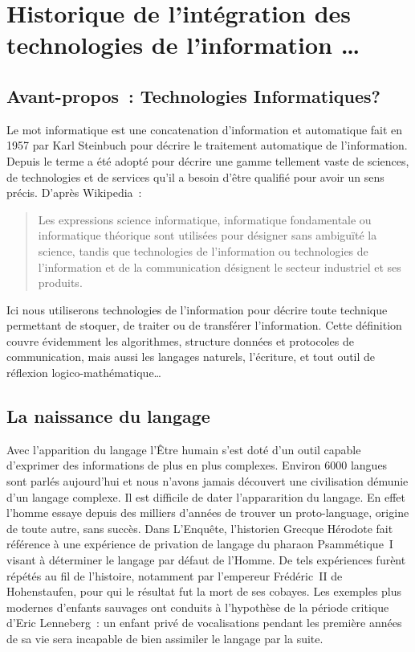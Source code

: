 
\chapter{Historique de l'intégration des technologies de l'information \ldots}\label{quoi}

\section*{Avant-propos~: Technologies \og{}Informatiques\fg{}?}
Le mot \og{}informatique\fg{} est une concatenation d'\og{}information\fg{} et \og{}automatique\fg{} fait en 1957 par Karl Steinbuch\cite{steinbuch-2005} pour décrire le traitement automatique de l'information. 
Depuis le terme a été adopté pour décrire une gamme tellement vaste de sciences, de technologies et de services qu'il a besoin d'être qualifié pour avoir un sens précis. D'après Wikipedia\cite{wiki-informatique}~:
\begin{quote}
Les expressions \og{}science informatique\fg{}, \og{}informatique fondamentale\fg{} ou \og{}informatique théorique\fg{} sont utilisées pour désigner sans ambiguïté la science, tandis que \og{}technologies de l'information\fg{} ou \og{}technologies de l'information et de la communication\fg{} désignent le secteur industriel et ses produits.
\end{quote}
Ici nous utiliserons \og{}technologies de l'information\fg{} pour décrire toute technique permettant de stoquer, de traiter ou de transférer l'information. Cette définition couvre évidemment les algorithmes, structure données et protocoles de communication, mais aussi les langages naturels, l'écriture, et tout outil de réflexion logico-mathématique\ldots

\section{La naissance du langage}
Avec l'apparition du langage l'Être humain s'est doté d'un outil capable d'exprimer des informations de plus en plus complexes. Environ 6000 langues sont parlés aujourd'hui et nous n'avons jamais découvert une civilisation démunie d'un langage complexe\cite{linguistics-pinker}. Il est difficile de dater l'appararition du langage. En effet l'homme essaye depuis des milliers d'années de trouver un \og{}proto-language\fg{}, origine de toute autre, sans succès. Dans \og{}L'Enquête\fg{}, l'historien Grecque Hérodote fait référence à une expérience de \og{}privation de langage\fg{} du pharaon Psammétique~I visant à déterminer le langage \og{}par défaut\fg{} de l'Homme\cite{herodote-privation}. De tels expériences furènt répétés au fil de l'histoire, notamment par l'empereur Frédéric~II de Hohenstaufen, pour qui le résultat fut la mort de ses \og{}cobayes\fg{}\cite{ggcoulton-francis-to-dante}. Les exemples plus modernes d'enfants \og{}sauvages\fg{} ont conduits à l'hypothèse de la \og{}période critique\fg{} d'Eric Lenneberg\cite{lenneberg-crit-period}~: un enfant privé de vocalisations pendant les première années de sa vie sera incapable de bien assimiler le langage par la suite.

